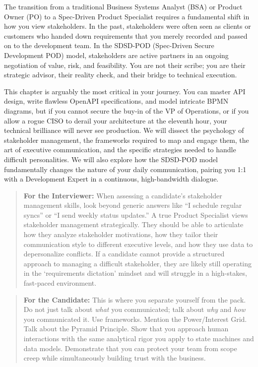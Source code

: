 The transition from a traditional Business Systems Analyst (BSA) or
Product Owner (PO) to a Spec-Driven Product Specialist requires a
fundamental shift in how you view stakeholders. In the past,
stakeholders were often seen as clients or customers who handed down
requirements that you merely recorded and passed on to the development
team. In the SDSD-POD (Spec-Driven Secure Development POD) model,
stakeholders are active partners in an ongoing negotiation of value,
risk, and feasibility. You are not their scribe; you are their strategic
advisor, their reality check, and their bridge to technical execution.

This chapter is arguably the most critical in your journey. You can
master API design, write flawless OpenAPI specifications, and model
intricate BPMN diagrams, but if you cannot secure the buy-in of the VP
of Operations, or if you allow a rogue CISO to derail your architecture
at the eleventh hour, your technical brilliance will never see
production. We will dissect the psychology of stakeholder management,
the frameworks required to map and engage them, the art of executive
communication, and the specific strategies needed to handle difficult
personalities. We will also explore how the SDSD-POD model fundamentally
changes the nature of your daily communication, pairing you 1:1 with a
Development Expert in a continuous, high-bandwidth dialogue.

\begin{quote}
\textbf{For the Interviewer:} When assessing a candidate's stakeholder
management skills, look beyond generic answers like ``I schedule regular
syncs'' or ``I send weekly status updates.'' A true Product Specialist
views stakeholder management strategically. They should be able to
articulate how they analyze stakeholder motivations, how they tailor
their communication style to different executive levels, and how they
use data to depersonalize conflicts. If a candidate cannot provide a
structured approach to managing a difficult stakeholder, they are likely
still operating in the `requirements dictation' mindset and will
struggle in a high-stakes, fast-paced environment.
\end{quote}

\begin{quote}
\textbf{For the Candidate:} This is where you separate yourself from the
pack. Do not just talk about \emph{what} you communicated; talk about
\emph{why} and \emph{how} you communicated it. Use frameworks. Mention
the Power/Interest Grid. Talk about the Pyramid Principle. Show that you
approach human interactions with the same analytical rigor you apply to
state machines and data models. Demonstrate that you can protect your
team from scope creep while simultaneously building trust with the
business.
\end{quote}

